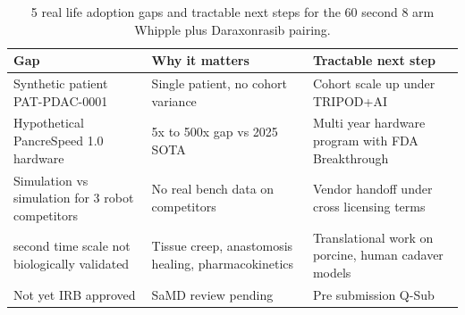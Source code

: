 \begin{table}[H]
\caption{5 real life adoption gaps and tractable next steps for the 60 second 8 arm Whipple plus Daraxonrasib pairing.}
\label{tab:discussion-realworld}
\centering
\begin{tabular}{>{\raggedright\arraybackslash}p{4.8cm} >{\raggedright\arraybackslash}p{5.4cm} >{\raggedright\arraybackslash}p{5.2cm}}
\toprule
\textbf{Gap} & \textbf{Why it matters} & \textbf{Tractable next step} \\
\midrule
  Synthetic patient PAT-PDAC-0001 & Single patient, no cohort variance & Cohort scale up under TRIPOD+AI \cite{Collins2024TRIPODAI} \\
  Hypothetical PancreSpeed 1.0 hardware & 5x to 500x gap vs 2025 SOTA & Multi year hardware program with FDA Breakthrough \\
  Simulation vs simulation for 3 robot competitors & No real bench data on competitors & Vendor handoff under cross licensing terms \\
  60 second time scale not biologically validated & Tissue creep, anastomosis healing, pharmacokinetics & Translational work on porcine, human cadaver models \\
  Not yet IRB approved & SaMD review pending & Pre submission Q-Sub \cite{fda-samd} \\
\bottomrule
\end{tabular}
\end{table}
